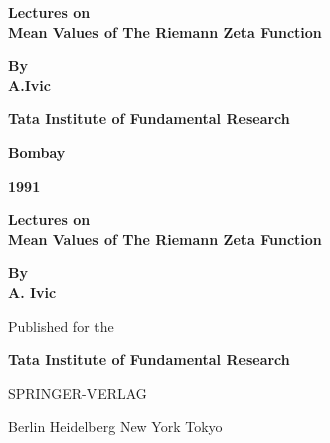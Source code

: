 \thispagestyle{empty}

\begin{center}
{\Large\bf  Lectures on}\\[5pt]
{\Large\bf Mean Values of The Riemann Zeta Function}\\[50pt]
\vfill

{\bf By}\\[10pt]

{\large\bf A.Ivic}
\vfill

{\bf Tata Institute of Fundamental Research}

{\bf Bombay}

{\bf 1991}
\end{center}

\eject

\thispagestyle{empty}
\begin{center}
{\Large\bf  Lectures on}\\[5pt]
{\Large\bf Mean Values of The Riemann Zeta Function}\\[50pt]
\vfill

{\bf By}\\[10pt]

{\large\bf A. Ivic}
\vfill



Published for the 

{\bf Tata Institute of Fundamental Research}

SPRINGER-VERLAG

Berlin Heidelberg New York Tokyo
\end{center}

\eject

\thispagestyle{empty}

